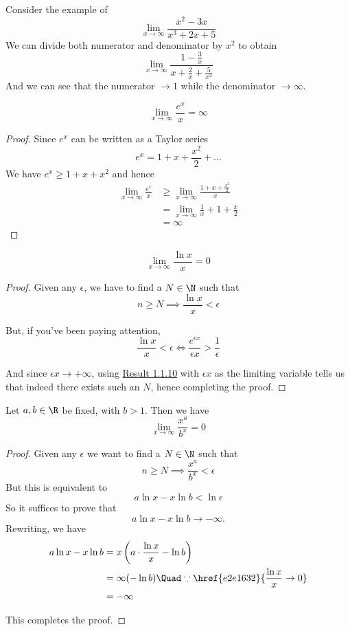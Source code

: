 \begin{compute}
	Consider the example of
	$$
		\lim_{x\to\infty}\frac{x^2 - 3x}{x^3 + 2x + 5}
	$$
	We can divide both numerator and denominator by $x^2$ to obtain
	$$
		\lim_{x\to\infty}\frac{1 - \frac3x}{x + \frac2x + \frac5{x^2}}
	$$
	And we can see that the numerator $\to1$ while the denominator
	$\to\infty$.
\end{compute}

\label{b905ee7}
$$
	\lim_{x\to\infty}\frac{e^x}x=\infty
$$

\begin{proof}
	Since $e^x$ can be written as a Taylor series
	$$
		e^x=1 + x + \frac{x^2}2 +\ldots
	$$
	We have $e^x\geq 1 + x + x^2$ and hence
	\begin{align}
		\lim_{x\to\infty}\frac{e^x}x
		 & \geq\lim_{x\to\infty}\frac{1+x+\frac{x^2}2}x \\
		 & =\lim_{x\to\infty}\frac1x + 1 + \frac{x}2    \\
		 & = \infty
	\end{align}
\end{proof}


\label{e2e1632}
$$
	\lim_{x\to\infty}\frac{\ln x}x = 0
$$

\begin{proof}
	Given any $\epsilon$, we have to find a $N\in\N$ such that
	$$
		n\geq N\implies\frac{\ln x}x<\epsilon
	$$

	But, if you've been paying attention,
	$$
		\frac{\ln x}x<\epsilon\iff\frac{e^{\epsilon x}}{\epsilon x}>\frac1\epsilon
	$$

	And since $\epsilon x\to+\infty$, using \href{b905ee7}{Result
		1.1.10} with $\epsilon x$ as the limiting variable tells us that
	indeed there exists such an $N$, hence completing the proof.
\end{proof}

\label{f3540b0}

Let $a,b\in\R$ be fixed, with $b>1$. Then we have
$$
	\lim_{x\to\infty}\frac{x^a}{b^x}=0
$$

\begin{proof}
	Given any $\epsilon$ we want to find a $N\in\N$ such that
	$$
		n\geq N\implies\frac{x^a}{b^x}<\epsilon
	$$
	But this is equivalent to
	$$
		a\ln x-x\ln b<\ln\epsilon
	$$
	So it suffices to prove that
	$$
		a\ln x-x\ln b\to-\infty.
	$$
	Rewriting, we have
	\begin{align}
		a\ln x-x\ln b
		 & = x\left(a\cdot\frac{\ln x}{x}-\ln b\right)                       \\
		 & = \infty(-\ln b) \Quad\because\href{e2e1632}{\frac{\ln x}{x}\to0} \\
		 & = -\infty
	\end{align}

	This completes the proof.
\end{proof}

